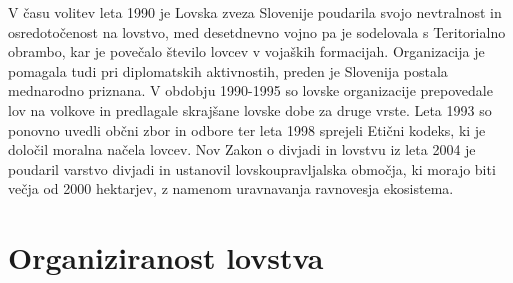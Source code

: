 \documentclass[a4paper,12pt,openright]{book}
\begin{document}
V času volitev leta 1990 je Lovska zveza Slovenije poudarila svojo nevtralnost in osredotočenost na lovstvo, med desetdnevno vojno pa je sodelovala s Teritorialno obrambo, kar je povečalo število lovcev v vojaških formacijah. 
Organizacija je pomagala tudi pri diplomatskih aktivnostih, preden je Slovenija postala mednarodno priznana. 
V obdobju 1990-1995 so lovske organizacije prepovedale lov na volkove in predlagale skrajšane lovske dobe za druge vrste.
Leta 1993 so ponovno uvedli občni zbor in odbore ter leta 1998 sprejeli Etični kodeks, ki je določil moralna načela lovcev. 
Nov Zakon o divjadi in lovstvu iz leta 2004 je poudaril varstvo divjadi in ustanovil lovskoupravljalska območja, ki morajo biti večja od 2000 hektarjev, z namenom uravnavanja ravnovesja ekosistema.\cite{Sto_83_104}

\section{Organiziranost lovstva}
\end{document}
